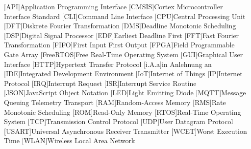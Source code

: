 \documentclass[../EDF Master Thesis.tex]{subfiles}
\begin{document}
    \begin{acronym}[abkuerzungen]
        [API]{Application Programming Interface}
        [CMSIS]{Cortex Microcontroller Interface Standard}
        [CLI]{Command Line Interface}
        [CPU]{Central Processing Unit}
        [DFT]{Diskrete Fourier Transformation}
        [DMS]{Deadline Monotonic Scheduling}
        [DSP]{Digital Signal Processor}
        [EDF]{Earliest Deadline First}
        [FFT]{Fast Fourier Transformation}
        [FIFO]{First Input First Output}
        [FPGA]{Field Programmable Gate Array}
        [FreeRTOS]{Free Real-Time Operating System}
        [GUI]{Graphical User Interface}
        [HTTP]{Hypertext Transfer Protocol}
        [i.A.a]{in Anlehnung an}
        [IDE]{Integrated Development Environment}
        [IoT]{Internet of Things}
        [IP]{Internet Protocol}
        [IRQ]{Interrupt Request}
        [ISR]{Interrupt Service Routine}
        [JSON]{JavaScript Object Notation}
        [LED]{Light Emitting Diode}
        [MQTT]{Message Queuing Telemetry Transport}
        [RAM]{Random-Access Memory}
        [RMS]{Rate Monotonic Scheduling}
        [ROM]{Read-Only Memory}
        [RTOS]{Real-Time Operating System}
        [TCP]{Transmission Control Protocol}
        [UDP]{User Datagram Protocol}
        [USART]{Universal Asynchronous Receiver Transmitter}
        [WCET]{Worst Execution Time}
        [WLAN]{Wireless Local Area Network}
	\end{acronym}
\end{document}
